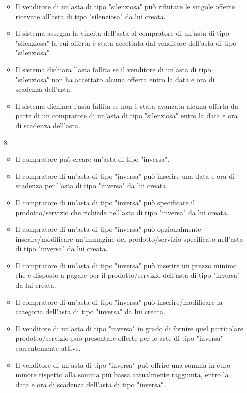 \begin{itemize}
\begin{itemize}
                    \item Il venditore di un'asta di tipo "silenziosa" può rifiutare le singole offerte ricevute all'asta di tipo "silenziosa" da lui creata.
                    \item Il sistema assegna la vincita dell'asta al compratore di un'asta di tipo "silenziosa" la cui offerta è stata accettata dal venditore dell'asta di tipo "silenziosa".
                    \item Il sistema dichiara l'asta fallita se il venditore di un'asta di tipo "silenziosa" non ha accettato alcuna offerta entro la data e ora di scadenza dell'asta.
                    \item Il sistema dichiara l'asta fallita se non è stata avanzata alcuna offerta da parte di un compratore di un'asta di tipo "silenziosa" entro la data e ora di scadenza dell'asta.
                \end{itemize}
            \item[8]
                \begin{itemize}            
                    \item Il compratore può creare un'asta di tipo "inversa".
                    \item Il compratore di un'asta di tipo "inversa" può inserire una data e ora di scadenza per l'asta di tipo "inversa" da lui creata.
                    \item Il compratore di un'asta di tipo "inversa" può specificare il prodotto/servizio che richiede nell'asta di tipo "inversa" da lui creata.
                    \item Il compratore di un'asta di tipo "inversa" può opzionalmente inserire/modificare un'immagine del prodotto/servizio specificato nell'asta di tipo "inversa" da lui creata.
                    \item Il compratore di un'asta di tipo "inversa" può inserire un prezzo minimo che è disposto a pagare per il prodotto/servizio dell'asta di tipo "inversa" da lui creata.
                    \item Il compratore di un'asta di tipo "inversa" può inserire/modificare la categoria dell'asta di tipo "inversa" da lui creata.
                    \item Il venditore di un'asta di tipo "inversa" in grado di fornire quel particolare prodotto/servizio può presentare offerte per le aste di tipo "inversa" correntemente attive.
                    \item Il venditore di un'asta di tipo "inversa" può offrire una somma in euro minore rispetto alla somma più bassa attualmente raggiunta, entro la data e ora di scadenza dell'asta di tipo "inversa".

\end{itemize}
\end{itemize}
